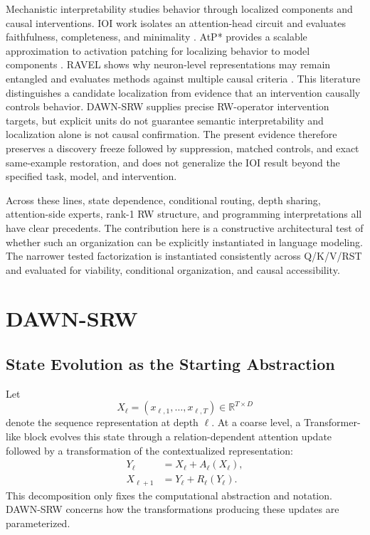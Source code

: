 \documentclass{article}
\newcommand{\R}{\mathbb{R}}
\newcommand{\DAWN}{DAWN-SRW}
\begin{document}
Mechanistic interpretability studies behavior through localized components and
causal interventions. IOI work isolates an attention-head circuit and evaluates
faithfulness, completeness, and minimality
\cite{wang2023interpretability}. AtP* provides a scalable approximation to
activation patching for localizing behavior to model components
\cite{kramar2024atp}. RAVEL shows why neuron-level representations may remain
entangled and evaluates methods against multiple causal criteria
\cite{huang2024ravel}. This literature distinguishes a candidate localization
from evidence that an intervention causally controls behavior. \DAWN{} supplies
precise RW-operator intervention targets, but explicit units do not guarantee
semantic interpretability and localization alone is not causal confirmation.
The present evidence therefore preserves a discovery freeze followed by
suppression, matched controls, and exact same-example restoration, and does not
generalize the IOI result beyond the specified task, model, and intervention.

Across these lines, state dependence, conditional routing, depth sharing,
attention-side experts, rank-1 RW structure, and programming interpretations all
have clear precedents. The contribution here is a constructive architectural
test of whether such an organization can be explicitly instantiated in language
modeling. The narrower tested factorization is instantiated consistently across
Q/K/V/RST and evaluated for viability, conditional organization, and causal
accessibility.

\section{DAWN-SRW}
\label{sec:method}

\subsection{State Evolution as the Starting Abstraction}
\label{sec:state-evolution}

Let
\[
X_\ell=(x_{\ell,1},\ldots,x_{\ell,T})\in\R^{T\times D}
\]
denote the sequence representation at depth \(\ell\). At a coarse level, a
Transformer-like block evolves this state through a relation-dependent
attention update followed by a transformation of the contextualized
representation:
\begin{align}
Y_\ell&=X_\ell+A_\ell(X_\ell),\\
X_{\ell+1}&=Y_\ell+R_\ell(Y_\ell).
\label{eq:state_evolution}
\end{align}
This decomposition only fixes the computational abstraction and notation.
\DAWN{} concerns how the transformations producing these updates are
parameterized.
\end{document}
